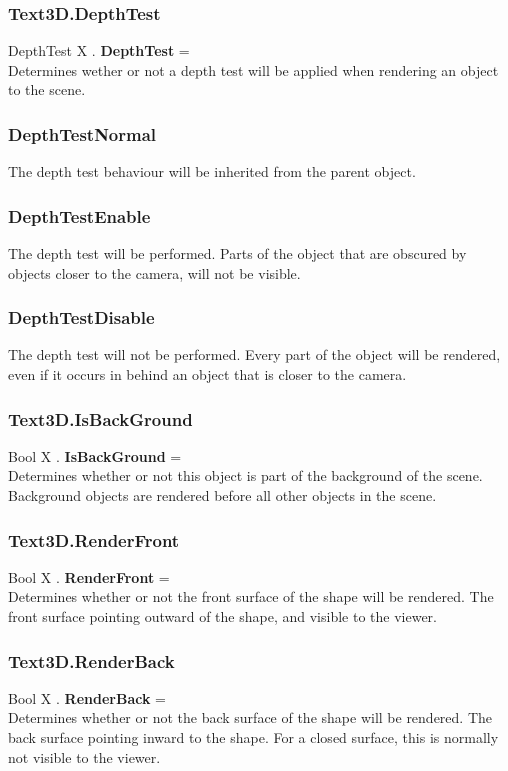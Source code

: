 \subsubsection{Text3D.DepthTest \label{F:Text3D:DepthTest}}
DepthTest X . \textbf{DepthTest} = \\
Determines wether or not a depth test will be applied when rendering an object to the scene.

\subsubsection{DepthTestNormal \label{T:DepthTest|DepthTestNormal}}
The depth test behaviour will be inherited from the parent object.

\subsubsection{DepthTestEnable \label{T:DepthTest|DepthTestEnable}}
The depth test will be performed. Parts of the object that are obscured by objects closer to the camera, will not be visible.

\subsubsection{DepthTestDisable \label{T:DepthTest|DepthTestDisable}}
The depth test will not be performed. Every part of the object will be rendered, even if it occurs in behind an object that is closer to the camera.

\subsubsection{Text3D.IsBackGround \label{F:Text3D:IsBackGround}}
Bool X . \textbf{IsBackGround} = \\
Determines whether or not this object is part of the background of the scene. Background objects are rendered before all other objects in the scene.

\subsubsection{Text3D.RenderFront \label{F:Text3D:RenderFront}}
Bool X . \textbf{RenderFront} = \\
Determines whether or not the front surface of the shape will be rendered. The front surface pointing outward of the shape, and visible to the viewer.

\subsubsection{Text3D.RenderBack \label{F:Text3D:RenderBack}}
Bool X . \textbf{RenderBack} = \\
Determines whether or not the back surface of the shape will be rendered. The back surface pointing inward to the shape. For a closed surface, this is normally not visible to the viewer.


